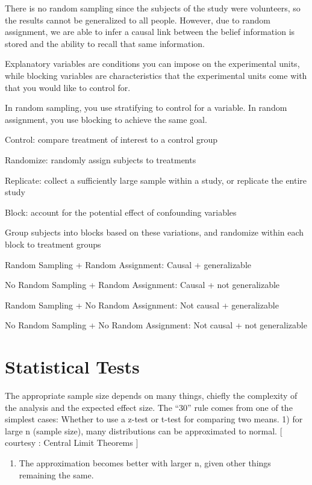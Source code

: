 \documentclass[]{book}
\providecommand{\tightlist}{%
  \setlength{\itemsep}{0pt}\setlength{\parskip}{0pt}}
\begin{document}
There is no random sampling since the subjects of the study were
volunteers, so the results cannot be generalized to all people. However,
due to random assignment, we are able to infer a causal link between the
belief information is stored and the ability to recall that same
information.

Explanatory variables are conditions you can impose on the experimental
units, while blocking variables are characteristics that the
experimental units come with that you would like to control for.

In random sampling, you use stratifying to control for a variable. In
random assignment, you use blocking to achieve the same goal.

Control: compare treatment of interest to a control group

Randomize: randomly assign subjects to treatments

Replicate: collect a sufficiently large sample within a study, or
replicate the entire study

Block: account for the potential effect of confounding variables

Group subjects into blocks based on these variations, and randomize
within each block to treatment groups

Random Sampling + Random Assignment: Causal + generalizable

No Random Sampling + Random Assignment: Causal + not generalizable

Random Sampling + No Random Assignment: Not causal + generalizable

No Random Sampling + No Random Assignment: Not causal + not
generalizable

\section{Statistical Tests}\label{statistical-tests}

The appropriate sample size depends on many things, chiefly the
complexity of the analysis and the expected effect size. The ``30'' rule
comes from one of the simplest cases: Whether to use a z-test or t-test
for comparing two means. 1) for large n (sample size), many
distributions can be approximated to normal. {[} courtesy : Central
Limit Theorems {]}

\begin{enumerate}
\def\labelenumi{\arabic{enumi})}
\setcounter{enumi}{1}
\tightlist
\item
  The approximation becomes better with larger n, given other things
  remaining the same.
\end{enumerate}
\end{document}
